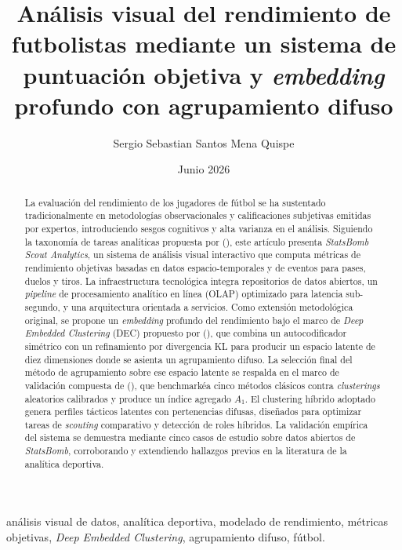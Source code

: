 \documentclass[conference]{IEEEtran}
\title{
  \textbf{Análisis visual del rendimiento de futbolistas mediante un sistema de puntuación objetiva y \textit{embedding} profundo con agrupamiento difuso}\\
}
\author{
    Sergio Sebastian Santos Mena Quispe
}
\date{Junio 2026}
\begin{document}
  \maketitle
  \begin{abstract}
    La evaluación del rendimiento de los jugadores de fútbol se ha sustentado tradicionalmente en metodologías observacionales y calificaciones subjetivas emitidas por expertos, introduciendo sesgos cognitivos y alta varianza en el análisis. Siguiendo la taxonomía de tareas analíticas propuesta por \citeauthor{evers2024visual} (\citeyear{evers2024visual}), este artículo presenta \textit{StatsBomb Scout Analytics}, un sistema de análisis visual interactivo que computa métricas de rendimiento objetivas basadas en datos espacio-temporales y de eventos para pases, duelos y tiros. La infraestructura tecnológica integra repositorios de datos abiertos, un \textit{pipeline} de procesamiento analítico en línea (OLAP) optimizado para latencia sub-segundo, y una arquitectura orientada a servicios. Como extensión metodológica original, se propone un \textit{embedding} profundo del rendimiento bajo el marco de \textit{Deep Embedded Clustering} (DEC) propuesto por \citeauthor{demir2026how} (\citeyear{demir2026how}), que combina un autocodificador simétrico con un refinamiento por divergencia KL para producir un espacio latente de diez dimensiones donde se asienta un agrupamiento difuso. La selección final del método de agrupamiento sobre ese espacio latente se respalda en el marco de validación compuesta de \citeauthor{akhanli2022clustering} (\citeyear{akhanli2022clustering}), que benchmarkéa cinco métodos clásicos contra \textit{clusterings} aleatorios calibrados y produce un índice agregado $A_1$. El clustering híbrido adoptado genera perfiles tácticos latentes con pertenencias difusas, diseñados para optimizar tareas de \textit{scouting} comparativo y detección de roles híbridos. La validación empírica del sistema se demuestra mediante cinco casos de estudio sobre datos abiertos de \textit{StatsBomb}, corroborando y extendiendo hallazgos previos en la literatura de la analítica deportiva.
  \end{abstract}
  \vspace{1em}
\begin{IEEEkeywords}
análisis visual de datos, analítica deportiva, modelado de rendimiento, métricas objetivas, \textit{Deep Embedded Clustering}, agrupamiento difuso, fútbol.
\end{IEEEkeywords}
  \vspace{2em}
\end{document}
